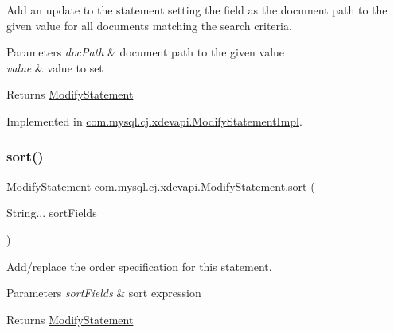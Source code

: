 Add an update to the statement setting the field as the document path to the given value for all documents matching the search criteria.


\begin{DoxyParams}{Parameters}
{\em doc\+Path} & document path to the given value \\
\hline
{\em value} & value to set \\
\hline
\end{DoxyParams}
\begin{DoxyReturn}{Returns}
\mbox{\hyperlink{interfacecom_1_1mysql_1_1cj_1_1xdevapi_1_1_modify_statement}{Modify\+Statement}} 
\end{DoxyReturn}


Implemented in \mbox{\hyperlink{classcom_1_1mysql_1_1cj_1_1xdevapi_1_1_modify_statement_impl_a4d22ce888e1c809740310f56cba2b6a3}{com.\+mysql.\+cj.\+xdevapi.\+Modify\+Statement\+Impl}}.

\mbox{\label{interfacecom_1_1mysql_1_1cj_1_1xdevapi_1_1_modify_statement_a55eabda9b2689157d35a7c56fcce51fe}} 
\subsubsection{\texorpdfstring{sort()}{sort()}}
{\footnotesize\ttfamily \mbox{\hyperlink{interfacecom_1_1mysql_1_1cj_1_1xdevapi_1_1_modify_statement}{Modify\+Statement}} com.\+mysql.\+cj.\+xdevapi.\+Modify\+Statement.\+sort (\begin{DoxyParamCaption}\item[{String...}]{sort\+Fields }\end{DoxyParamCaption})}

Add/replace the order specification for this statement.


\begin{DoxyParams}{Parameters}
{\em sort\+Fields} & sort expression \\
\hline
\end{DoxyParams}
\begin{DoxyReturn}{Returns}
\mbox{\hyperlink{interfacecom_1_1mysql_1_1cj_1_1xdevapi_1_1_modify_statement}{Modify\+Statement}} 
\end{DoxyReturn}
\mbox{\label{interfacecom_1_1mysql_1_1cj_1_1xdevapi_1_1_modify_statement_a32c8da3dfdab70bf211d44db0c2f7ca2}} 

